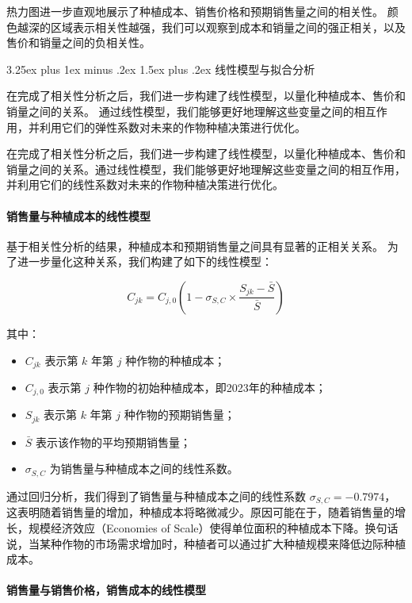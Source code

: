 \documentclass[12pt,a4paper]{nmmcm}
\makeatletter
\renewcommand\subsection{\@startsection{subsection}{2}{0pt}%
    {3.25ex plus 1ex minus .2ex}%
    {1.5ex plus .2ex}%
    {\normalfont\Large\bfseries}}
\makeatother
\begin{document}
热力图进一步直观地展示了种植成本、销售价格和预期销售量之间的相关性。
颜色越深的区域表示相关性越强，我们可以观察到成本和销量之间的强正相关，以及售价和销量之间的负相关性。


\subsection{线性模型与拟合分析}

在完成了相关性分析之后，我们进一步构建了线性模型，以量化种植成本、售价和销量之间的关系。
通过线性模型，我们能够更好地理解这些变量之间的相互作用，并利用它们的弹性系数对未来的作物种植决策进行优化。

在完成了相关性分析之后，我们进一步构建了线性模型，以量化种植成本、售价和销量之间的关系。通过线性模型，我们能够更好地理解这些变量之间的相互作用，并利用它们的线性系数对未来的作物种植决策进行优化。

\paragraph{销售量与种植成本的线性模型}

基于相关性分析的结果，种植成本和预期销售量之间具有显著的正相关关系。
为了进一步量化这种关系，我们构建了如下的线性模型：

\[
  C_{jk} = C_{j,0} \left(1 - \sigma_{S,C} \times \frac{S_{jk} - \bar{S}}{\bar{S}} \right)
\]

其中：
\begin{itemize}
  \item $C_{jk}$ 表示第 $k$ 年第 $j$ 种作物的种植成本；
  \item $C_{j,0}$ 表示第 $j$ 种作物的初始种植成本，即2023年的种植成本；
  \item $S_{jk}$ 表示第 $k$ 年第 $j$ 种作物的预期销售量；
  \item $\bar{S}$ 表示该作物的平均预期销售量；
  \item $\sigma_{S,C}$ 为销售量与种植成本之间的线性系数。
\end{itemize}

通过回归分析，我们得到了销售量与种植成本之间的线性系数 $\sigma_{S,C} = -0.7974$，这表明随着销售量的增加，种植成本将略微减少。原因可能在于，随着销售量的增长，规模经济效应（Economies of Scale）使得单位面积的种植成本下降。换句话说，当某种作物的市场需求增加时，种植者可以通过扩大种植规模来降低边际种植成本。

\paragraph{销售量与销售价格，销售成本的线性模型}
\end{document}
